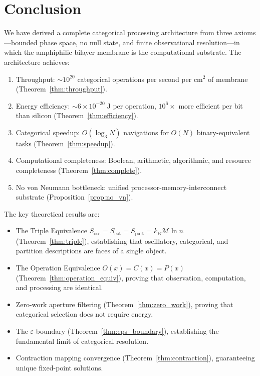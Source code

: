 \documentclass[twocolumn,10pt]{article}
\theoremstyle{remark}
\newcommand{\kB}{k_{\mathrm{B}}}
\newcommand{\Depth}{\mathcal{M}}
\newcommand{\eps}{\varepsilon}
\newcommand{\Sosc}{S_{\mathrm{osc}}}
\newcommand{\Scat}{S_{\mathrm{cat}}}
\newcommand{\Spart}{S_{\mathrm{part}}}
\begin{document}
\section{Conclusion}
\label{sec:conclusion}

We have derived a complete categorical processing architecture from three axioms---bounded phase space, no null state, and finite observational resolution---in which the amphiphilic bilayer membrane is the computational substrate. The architecture achieves:

\begin{enumerate}
\item Throughput: $\sim 10^{20}$ categorical operations per second per $\mathrm{cm}^2$ of membrane (Theorem~\ref{thm:throughput}).
\item Energy efficiency: $\sim 6 \times 10^{-20}\;\mathrm{J}$ per operation, $10^6\times$ more efficient per bit than silicon (Theorem~\ref{thm:efficiency}).
\item Categorical speedup: $O(\log_3 N)$ navigations for $O(N)$ binary-equivalent tasks (Theorem~\ref{thm:speedup}).
\item Computational completeness: Boolean, arithmetic, algorithmic, and resource completeness (Theorem~\ref{thm:complete}).
\item No von Neumann bottleneck: unified processor-memory-interconnect substrate (Proposition~\ref{prop:no_vn}).
\end{enumerate}

The key theoretical results are:
\begin{itemize}
\item The Triple Equivalence $\Sosc = \Scat = \Spart = \kB \Depth \ln n$ (Theorem~\ref{thm:triple}), establishing that oscillatory, categorical, and partition descriptions are faces of a single object.
\item The Operation Equivalence $O(x) = C(x) = P(x)$ (Theorem~\ref{thm:operation_equiv}), proving that observation, computation, and processing are identical.
\item Zero-work aperture filtering (Theorem~\ref{thm:zero_work}), proving that categorical selection does not require energy.
\item The $\eps$-boundary (Theorem~\ref{thm:eps_boundary}), establishing the fundamental limit of categorical resolution.
\item Contraction mapping convergence (Theorem~\ref{thm:contraction}), guaranteeing unique fixed-point solutions.
\end{itemize}
\end{document}
